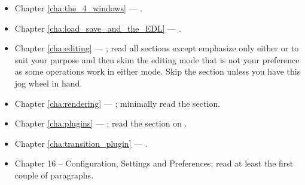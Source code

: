 \begin{itemize}
    \item Chapter \ref{cha:the_4_windows} --- .
    \item Chapter \ref{cha:load_save_and_the_EDL} --- .
    \item Chapter \ref{cha:editing} --- ; read all sections except emphasize only either  or  to suit your purpose and then skim the editing mode that is not your preference as some operations work in either mode. 
        Skip the  section unless you have this jog wheel in hand.
    \item Chapter \ref{cha:rendering} --- ; minimally read the  section.
    \item Chapter \ref{cha:plugins} --- ; read the section on .
    \item Chapter \ref{cha:transition_plugin} --- .
    \item Chapter 16 – Configuration, Settings and Preferences; read at least the first couple of paragraphs.
\end{itemize}


